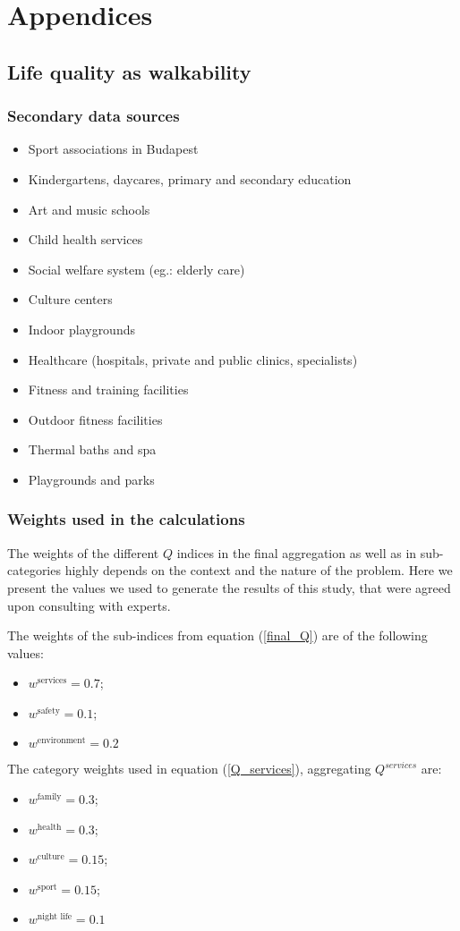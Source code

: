 \chapter{Appendices}

\section{Life quality as walkability}

\subsection{Secondary data sources}
\label{SI:walkabilityData}
\begin{itemize}
  \item {Sport associations in Budapest}~\cite{HU_sport}
  \item {Kindergartens, daycares, primary and secondary education}~\cite{HU_Edu}
  \item {Art and music schools}~\cite{HU_Art}
  \item {Child health services}~\cite{HU_Child}
  \item {Social welfare system (eg.: elderly care)}~\cite{HU_Social}
  \item{Culture centers}~\cite{HU_Cult}
  \item {Indoor playgrounds}~\cite{HU_Play}
  \item{Healthcare (hospitals, private and public clinics, specialists)}~\cite{HU_Health}
  \item{Fitness and training facilities}~\cite{HU_Fitness}
  \item{Outdoor fitness facilities}~\cite{HU_outfitness}
  \item{Thermal baths and spa}~\cite{HU_Thermal}
  \item{Playgrounds and parks}~\cite{HU_Park}
\end{itemize}

\subsection{Weights used in the calculations}
The weights of the different $Q$ indices in the final aggregation as well as in sub-categories highly depends on the context and the nature of the problem. Here we present the values we used to generate the results of this study, that were agreed upon consulting with experts.

The weights of the sub-indices from equation (\ref{final_Q}) are of the following values:
\begin{itemize}
  \item $w^{\text{services}}=0.7$;
  \item $w^{\text{safety}}=0.1$;
  \item $w^{\text{environment}}=0.2$
\end{itemize}

The category weights used in equation (\ref{Q_services}), aggregating $Q^{services}$ are:

\begin{itemize}
  \item $w^{\text{family}}= 0.3$;
  \item $w^{\text{health}}= 0.3$;
  \item $w^{\text{culture}} = 0.15$;
  \item $w^{\text{sport}} = 0.15$;
  \item $w^{\text{night life}}=0.1$
\end{itemize}
